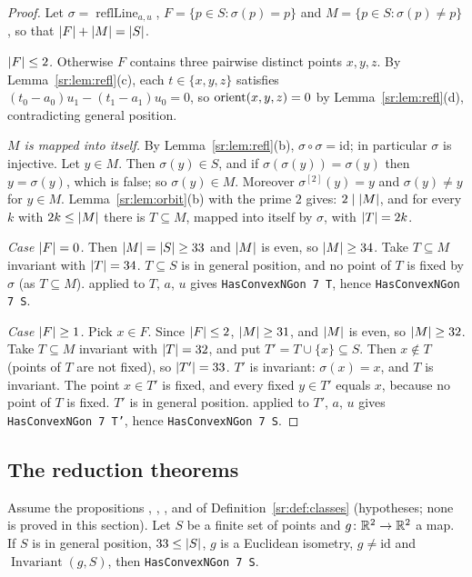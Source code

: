 \begin{proof}
Let $\sigma=\operatorname{reflLine}_{a,u}$, $F=\{p\in S:\sigma(p)=p\}$ and $M=\{p\in S:\sigma(p)\ne p\}$, so that
$\lvert F\rvert+\lvert M\rvert=\lvert S\rvert$.

\emph{$\lvert F\rvert\le2$.} Otherwise $F$ contains three pairwise distinct points $x,y,z$. By Lemma~\ref{sr:lem:refl}(c),
each $t\in\{x,y,z\}$ satisfies $(t_0-a_0)u_1-(t_1-a_1)u_0=0$, so $\operatorname{orient}(x,y,z)=0$ by Lemma~\ref{sr:lem:refl}(d),
contradicting general position.

\emph{$M$ is mapped into itself.} By Lemma~\ref{sr:lem:refl}(b), $\sigma\circ\sigma=\mathrm{id}$; in particular $\sigma$
is injective. Let $y\in M$. Then $\sigma(y)\in S$, and if $\sigma(\sigma(y))=\sigma(y)$ then $y=\sigma(y)$, which is
false; so $\sigma(y)\in M$. Moreover $\sigma^{[2]}(y)=y$ and $\sigma(y)\ne y$ for $y\in M$. Lemma~\ref{sr:lem:orbit}(b)
with the prime $2$ gives: $2\mid\lvert M\rvert$, and for every $k$ with $2k\le\lvert M\rvert$ there is $T\subseteq M$, mapped into
itself by $\sigma$, with $\lvert T\rvert=2k$.

\emph{Case $\lvert F\rvert=0$.} Then $\lvert M\rvert=\lvert S\rvert\ge33$ and $\lvert M\rvert$ is even, so $\lvert M\rvert\ge34$. Take $T\subseteq M$
invariant with $\lvert T\rvert=34$. $T\subseteq S$ is in general position, and no point of $T$ is fixed by $\sigma$ (as
$T\subseteq M$).  applied to $T$, $a$, $u$ gives \texttt{HasConvexNGon 7 T}, hence
\texttt{HasConvexNGon 7 S}.

\emph{Case $\lvert F\rvert\ge1$.} Pick $x\in F$. Since $\lvert F\rvert\le2$, $\lvert M\rvert\ge31$, and $\lvert M\rvert$ is even, so $\lvert M\rvert\ge32$.
Take $T\subseteq M$ invariant with $\lvert T\rvert=32$, and put $T'=T\cup\{x\}\subseteq S$. Then $x\notin T$ (points of $T$ are
not fixed), so $\lvert T'\rvert=33$. $T'$ is invariant: $\sigma(x)=x$, and $T$ is invariant. The point $x\in T'$ is fixed, and
every fixed $y\in T'$ equals $x$, because no point of $T$ is fixed. $T'$ is in general position. 
applied to $T'$, $a$, $u$ gives \texttt{HasConvexNGon 7 T'}, hence \texttt{HasConvexNGon 7 S}.
\end{proof}

\subsection{The reduction theorems}\label{sr:ssec:main}

\begin{theorem}\label{sr:thm:main}
Assume the propositions , , ,  and
 of Definition~\ref{sr:def:classes} (hypotheses; none is proved in this section). Let $S$ be a
finite set of points and $g\colon\mathbb R^2\to\mathbb R^2$ a map. If $S$ is in general position, $33\le\lvert S\rvert$, $g$ is a Euclidean
isometry, $g\ne\mathrm{id}$ and $\operatorname{Invariant}(g,S)$, then \texttt{HasConvexNGon 7 S}.
\end{theorem}

